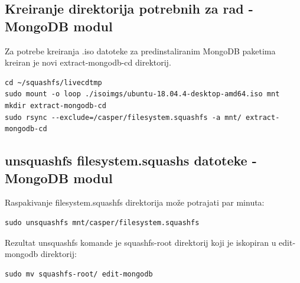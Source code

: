 \documentclass[12pt,vi]{mitthesis}
\begin{document}
\subsection*{Kreiranje direktorija potrebnih za rad - MongoDB modul}
\indent
Za potrebe kreiranja .iso datoteke za predinstaliranim MongoDB paketima kreiran je novi extract-mongodb-cd direktorij.
\begin{lstlisting}[style=BashInputStyle]
cd ~/squashfs/livecdtmp
sudo mount -o loop ./isoimgs/ubuntu-18.04.4-desktop-amd64.iso mnt
mkdir extract-mongodb-cd
sudo rsync --exclude=/casper/filesystem.squashfs -a mnt/ extract-mongodb-cd
\end{lstlisting}
\subsection*{unsquashfs filesystem.squashs datoteke - MongoDB modul}
\noindent
Raspakivanje filesystem.squashfs direktorija može potrajati par minuta:\\
\begin{lstlisting}[style=BashInputStyle]
sudo unsquashfs mnt/casper/filesystem.squashfs
\end{lstlisting}
Rezultat unsquashfs komande je squashfs-root direktorij koji je iskopiran u edit-mongodb direktorij:
\begin{lstlisting}[style=BashInputStyle]
sudo mv squashfs-root/ edit-mongodb
\end{lstlisting}
\end{document}
